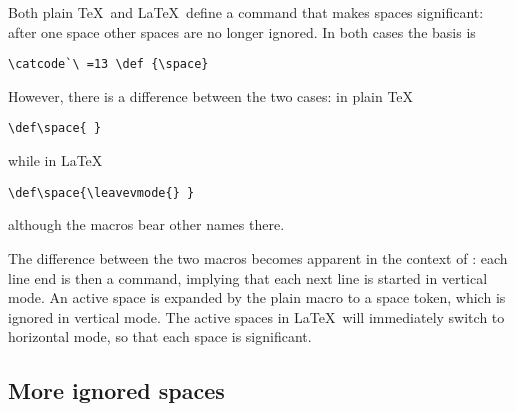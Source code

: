 \documentclass{book}
\begin{document}
Both plain \TeX\ and \LaTeX\ define a command 
\altt
that makes spaces significant: after one space other spaces are no
longer ignored. In both cases the basis is
\altt
\begin{verbatim}
\catcode`\ =13 \def {\space}
\end{verbatim}
However, there is a difference between the two cases:
in plain \TeX\ \begin{verbatim}
\def\space{ }
\end{verbatim}
while in \LaTeX\ \begin{verbatim}
\def\space{\leavevmode{} }
\end{verbatim}
although the macros bear other names there.

The difference between the two macros becomes
apparent in the context of :
each line end is then a  command, implying that
each next line is started in vertical mode.
An active space is expanded by the plain macro to a space token, 
which is ignored in vertical mode.
The active spaces in \LaTeX\ will immediately switch to horizontal
mode, so that each space is significant.

\subsection{More ignored spaces}
\end{document}
